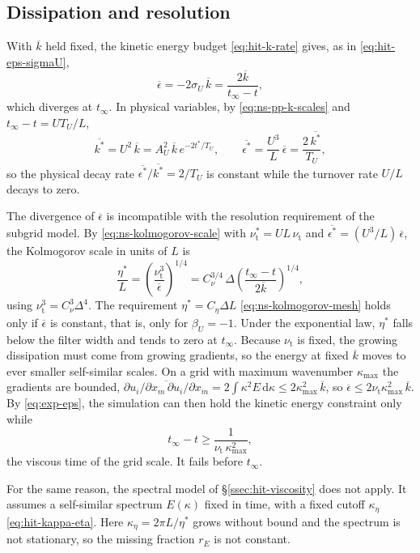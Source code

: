 \documentclass{article}
\begin{document}
\subsection{Dissipation and resolution}\label{ssec:exp-eps}
With $\overline{k}$ held fixed, the kinetic energy budget
\eqref{eq:hit-k-rate} gives, as in \eqref{eq:hit-eps-sigmaU},
\begin{equation}\label{eq:exp-eps}
  \overline{\epsilon} = -2\sigma_U\, \overline{k}
  = \frac{2\overline{k}}{t_\infty - t} ,
\end{equation}
which diverges at $t_\infty$. In physical variables, by
\eqref{eq:ns-pp-k-scales} and $t_\infty - t = U T_U / L$,
\begin{equation}\label{eq:exp-eps-dim}
  \overline{k^*} = U^2\, \overline{k} = A_U^2\, \overline{k}\, e^{-2t^*/T_U},
  \qquad
  \overline{\epsilon^*} = \frac{U^3}{L}\, \overline{\epsilon}
  = \frac{2\, \overline{k^*}}{T_U} ,
\end{equation}
so the physical decay rate $\overline{\epsilon^*}/\overline{k^*} = 2/T_U$ is
constant while the turnover rate $U/L$ decays to zero.
\par
The divergence of $\overline{\epsilon}$ is incompatible with the resolution
requirement of the subgrid model. By \eqref{eq:ns-kolmogorov-scale} with
$\nu_{\mathrm{t}}^* = UL\, \nu_{\mathrm{t}}$ and
$\overline{\epsilon^*} = (U^3/L)\, \overline{\epsilon}$, the Kolmogorov scale
in units of $L$ is
\begin{equation}\label{eq:exp-eta}
  \frac{\eta^*}{L} = \left( \frac{\nu_{\mathrm{t}}^3}{\overline{\epsilon}} \right)^{1/4}
  = C_\nu^{3/4}\, \Delta \left( \frac{t_\infty - t}{2\overline{k}} \right)^{1/4} ,
\end{equation}
using $\nu_{\mathrm{t}}^3 = C_\nu^3 \Delta^4$. The requirement
$\eta^* = C_\eta \Delta L$ \eqref{eq:ns-kolmogorov-mesh} holds only if
$\overline{\epsilon}$ is constant, that is, only for $\beta_U = -1$. Under the
exponential law, $\eta^*$ falls below the filter width and tends to zero at
$t_\infty$. Because $\nu_{\mathrm{t}}$ is fixed, the growing dissipation must
come from growing gradients, so the energy at fixed $\overline{k}$ moves to
ever smaller self-similar scales. On a grid with maximum wavenumber
$\kappa_{\max}$ the gradients are bounded,
$\overline{\partial u_i/\partial x_m\, \partial u_i/\partial x_m}
= 2\int \kappa^2 E\, \mathrm{d}\kappa \le 2\kappa_{\max}^2\, \overline{k}$,
so $\overline{\epsilon} \le 2\nu_{\mathrm{t}} \kappa_{\max}^2\, \overline{k}$.
By \eqref{eq:exp-eps}, the simulation can then hold the kinetic energy
constraint only while
\begin{equation}\label{eq:exp-breakdown}
  t_\infty - t \ge \frac{1}{\nu_{\mathrm{t}}\, \kappa_{\max}^2} ,
\end{equation}
the viscous time of the grid scale. It fails before $t_\infty$.
\par
For the same reason, the spectral model of \S\ref{ssec:hit-viscosity} does not
apply. It assumes a self-similar spectrum $E(\kappa)$ fixed in time, with a
fixed cutoff $\kappa_\eta$ \eqref{eq:hit-kappa-eta}. Here $\kappa_\eta = 2\pi
L/\eta^*$ grows without bound and the spectrum is not stationary, so the
missing fraction $r_E$ is not constant.
\end{document}

